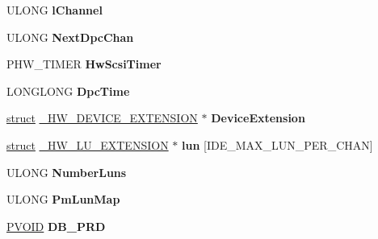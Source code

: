 \begin{DoxyCompactItemize}
\mbox{\label{struct___h_w___c_h_a_n_n_e_l_a4c72dbc0c6828cbde0d8eeb6be3955f6}} 
U\+L\+O\+NG {\bfseries l\+Channel}
\item 
\mbox{\label{struct___h_w___c_h_a_n_n_e_l_a7d6a379633ac486d926edf00cf44163a}} 
U\+L\+O\+NG {\bfseries Next\+Dpc\+Chan}
\item 
\mbox{\label{struct___h_w___c_h_a_n_n_e_l_a377037e4c46b6250220f68faf25c9287}} 
P\+H\+W\+\_\+\+T\+I\+M\+ER {\bfseries Hw\+Scsi\+Timer}
\item 
\mbox{\label{struct___h_w___c_h_a_n_n_e_l_aeb817c845ea9782eb0a2c77ad47d8018}} 
L\+O\+N\+G\+L\+O\+NG {\bfseries Dpc\+Time}
\item 
\mbox{\label{struct___h_w___c_h_a_n_n_e_l_af7823b49a17a87d8556b79f7d9251222}} 
\hyperlink{interfacestruct}{struct} \hyperlink{struct___h_w___d_e_v_i_c_e___e_x_t_e_n_s_i_o_n}{\+\_\+\+H\+W\+\_\+\+D\+E\+V\+I\+C\+E\+\_\+\+E\+X\+T\+E\+N\+S\+I\+ON} $\ast$ {\bfseries Device\+Extension}
\item 
\mbox{\label{struct___h_w___c_h_a_n_n_e_l_aa01d7b75ecffdf439a385f43225c5e90}} 
\hyperlink{interfacestruct}{struct} \hyperlink{struct___h_w___l_u___e_x_t_e_n_s_i_o_n}{\+\_\+\+H\+W\+\_\+\+L\+U\+\_\+\+E\+X\+T\+E\+N\+S\+I\+ON} $\ast$ {\bfseries lun} \mbox{[}I\+D\+E\+\_\+\+M\+A\+X\+\_\+\+L\+U\+N\+\_\+\+P\+E\+R\+\_\+\+C\+H\+AN\mbox{]}
\item 
\mbox{\label{struct___h_w___c_h_a_n_n_e_l_a23bcc979bd698e03bbc4a3144fa76a2f}} 
U\+L\+O\+NG {\bfseries Number\+Luns}
\item 
\mbox{\label{struct___h_w___c_h_a_n_n_e_l_a5a9eca9586b4b7e5284d19fb83444697}} 
U\+L\+O\+NG {\bfseries Pm\+Lun\+Map}
\item 
\mbox{\label{struct___h_w___c_h_a_n_n_e_l_a61d7983f08898744dfdb88ff0bf5685a}} 
\hyperlink{interfacevoid}{P\+V\+O\+ID} {\bfseries D\+B\+\_\+\+P\+RD}
\item 
\mbox{\label{struct___h_w___c_h_a_n_n_e_l_a649b94015620e166703d6bdbe8d37c8f}} 

\end{DoxyCompactItemize}
